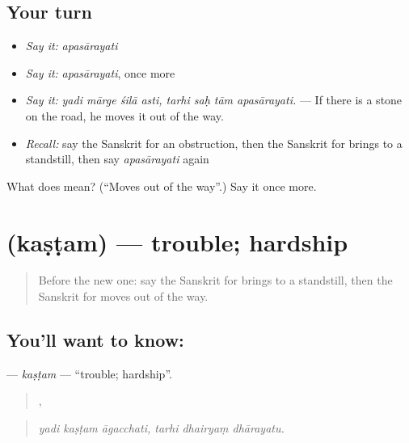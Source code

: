 \subsection*{Your turn}
\begin{itemize}
\raggedright
  \item \emph{Say it:} \emph{apasārayati}
  \item \emph{Say it:} \emph{apasārayati}, once more
  \item \emph{Say it:} \emph{yadi mārge śilā asti, tarhi saḥ tām apasārayati.} — If there is a stone on the road, he moves it out of the way.
  \item \emph{Recall:} say the Sanskrit for an obstruction, then the Sanskrit for brings to a standstill, then say \emph{apasārayati} again
\end{itemize}

\begin{tcolorbox}[breakable,colback=teal!4,colframe=teal!35!black,title={Before you move on}]
What does  mean? (\textquotedblleft{}Moves out of the way\textquotedblright{}.) Say it once more.
\end{tcolorbox}
\section[\texorpdfstring{\sk{कष्टम्} (kaṣṭam)}{कष्टम् (kaṣṭam)}]{ (kaṣṭam) — trouble; hardship}

\label{lesson:SA-C533-kastam}



\begin{quote}
Before the new one: say the Sanskrit for brings to a standstill, then the Sanskrit for moves out of the way.
\end{quote}

\subsection*{You'll want to know: }
\textbf{} — \emph{kaṣṭam} — \textquotedblleft{}trouble; hardship\textquotedblright{}.

\begin{quote}
  ,   
\end{quote}

\begin{quote}
\emph{yadi kaṣṭam āgacchati, tarhi dhairyaṃ dhārayatu.}
\end{quote}

